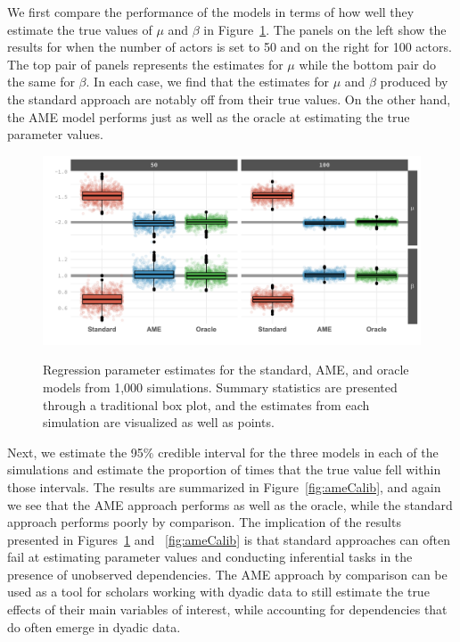 We first compare the performance of the models in terms of how well they estimate the true values of $\mu$ and $\beta$ in Figure~\ref{fig:ameBias}. The panels on the left show the results for when the number of actors is set to 50 and on the  right for 100 actors. The top pair of panels represents the estimates for $\mu$ while the bottom pair do the same for $\beta$. In each case, we find that the estimates for $\mu$ and $\beta$ produced by the standard approach are notably off from their true values. On the other hand, the AME model performs just as well as the oracle at estimating the true parameter values.

\begin{figure}
	\centering
	\caption{Regression parameter estimates for the standard, AME, and oracle models from 1,000 simulations. Summary statistics are presented through a traditional box plot, and the estimates from each simulation are visualized as well as points.}
	\label{fig:ameBias}
	\includegraphics[width=1\textwidth]{graphics/figure3.pdf} \\
\end{figure}

Next, we estimate the 95\% credible interval for the three models in each of the simulations and estimate the proportion of times that the true value fell within those intervals. The results are summarized in Figure~\ref{fig:ameCalib}, and again we see that the AME approach performs as well as the oracle, while the standard approach performs poorly by comparison. The implication of the results presented in Figures~\ref{fig:ameBias} and ~\ref{fig:ameCalib} is that standard approaches can often fail at estimating parameter values and conducting inferential tasks in the presence of unobserved dependencies. The AME approach by comparison can be used as a tool for scholars working with dyadic data to still estimate the true effects of their main variables of interest, while accounting for dependencies that do often emerge in dyadic data.


